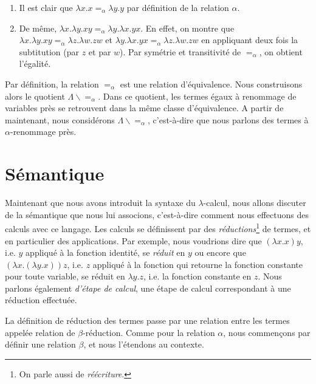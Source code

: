 \begin{exemple}
  \begin{enumerate}
    \item Il est clair que $\lambda x . x =_{\alpha} \lambda y . y$ par
    définition de la relation $\alpha$.
    \item De même, $\lambda x . \lambda y . x y =_{\alpha} \lambda y . \lambda x
      . y x$. En
      effet, on montre que $\lambda x . \lambda y . x y =_{\alpha} \lambda z .
      \lambda w. z
      w$ et $\lambda y . \lambda x . y x =_{\alpha} \lambda z . \lambda w . z w$ en appliquant
      deux fois la subtitution (par $z$ et par $w$). Par symétrie
      et transitivité de $=_{\alpha}$, on obtient l'égalité.
  \end{enumerate}
\end{exemple}

Par définition, la relation $=_{\alpha}$ est une relation d'équivalence. Nous
construisons alors le quotient $\Lambda \backslash =_{\alpha}$. Dans ce
quotient, les termes égaux à renommage de variables près se retrouvent dans la
même classe d'équivalence. A partir de maintenant, nous considérons $\Lambda
\backslash =_{\alpha}$, c'est-à-dire que nous parlons des termes à $\alpha$-renommage près.

\section{Sémantique}

Maintenant que nous avons introduit la syntaxe du $\lambda$-calcul, nous allons
discuter de la sémantique que nous lui associons, c'est-à-dire comment nous
effectuons des calculs avec ce langage. Les calculs
se définissent par des \textit{réductions}\footnote{On parle aussi de
\textit{réécriture}.} de termes, et en particulier des applications. Par exemple,
nous voudrions dire que $(\lambda x . x) y$, i.e. $y$ appliqué à la fonction
identité, se \textit{réduit} en $y$ ou encore que $(\lambda x . (\lambda y . x))
z$, i.e. $z$ appliqué à la fonction qui retourne la fonction constante pour
toute variable, se réduit en $\lambda y . z$, i.e. la fonction
constante en $z$. Nous parlons également \textit{d'étape de calcul}, une étape
de calcul correspondant à une réduction effectuée.

La définition de réduction des termes passe par une relation entre les
termes appelée relation de $\beta$-réduction.
Comme pour la relation $\alpha$, nous commençons par définir une relation
$\beta$, et nous l'étendons au contexte.

